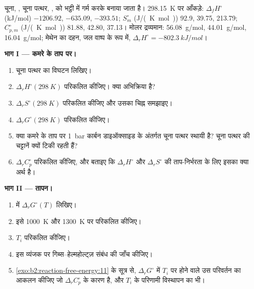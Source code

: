\begin{problem}
\label{pb:b2:reaction-free-energy:1}
चूना, , चूना पत्थर, , को भट्ठी में गर्म करके बनाया जाता है।
\qty{298.15}{K} पर आँकड़े: $\Delta_f H^\circ$ (\unit{kJ/mol}) 
$-1206.92$,  $-635.09$,  $-393.51$; $S^\circ_m$
(\unit{J/(K.mol)}) 92.9, 39.75, 213.79; $C^\circ_{p,m}$ (\unit{J/(K.mol)})
81.88, 42.80, 37.13। मोलर द्रव्यमान:  \qty{56.08}{g/mol}, 
\qty{44.01}{g/mol},  \qty{16.04}{g/mol}; मेथेन का दहन,
जल वाष्प के रूप में, $\Delta_r H^\circ = \qty{-802.3}{kJ/mol}$।

\medskip
\noindent\textbf{भाग I --- कमरे के ताप पर।}
\begin{enumerate}
  \item चूना पत्थर का विघटन लिखिए।
  \item $\Delta_r H^\circ(\qty{298}{K})$ परिकलित कीजिए। क्या अभिक्रिया  है?
  \item $\Delta_r S^\circ(\qty{298}{K})$ परिकलित कीजिए और उसका चिह्न समझाइए।
  \item $\Delta_r G^\circ(\qty{298}{K})$ परिकलित कीजिए।
  \item क्या कमरे के ताप पर \qty{1}{bar} कार्बन डाइऑक्साइड के अंतर्गत चूना पत्थर
        स्थायी है? चूना पत्थर की चट्टानें क्यों टिकी रहती हैं?
  \item $\Delta_r C^\circ_p$ परिकलित कीजिए, और बताइए कि $\Delta_r H^\circ$ और $\Delta_r S^\circ$ की
        ताप-निर्भरता के लिए इसका क्या अर्थ है।
\end{enumerate}

\medskip
\noindent\textbf{भाग II --- तापन।}
\begin{enumerate}[resume]
  \item {} में $\Delta_r G^\circ(T)$ लिखिए।
  \item इसे \qty{1000}{K} और \qty{1300}{K} पर परिकलित कीजिए।
  \item {} $T_i$ परिकलित कीजिए।
  \item इस व्यंजक पर गिब्स--हेल्महोल्ट्ज़ संबंध की जाँच कीजिए।
  \item \cref{exo:b2:reaction-free-energy:11} के सूत्र से,
        $\Delta_r G^\circ$ में $T_i$ पर होने वाले उस परिवर्तन का आकलन कीजिए जो
        $\Delta_r C^\circ_p$ के कारण है, और $T_i$ के परिणामी विस्थापन का भी।
\end{enumerate}


\end{problem}
